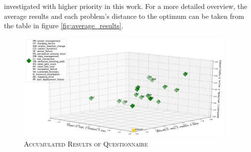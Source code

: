 \documentclass[english, master, utf8]{base/thesis_KBS}
\begin{document}
investigated with higher priority in this work. For a more detailed overview, the average results and each problem's distance to the optimum can be taken from the table 
in figure \ref{fig:average_results}.
\begin{figure}[H]
    \centering
    \includegraphics[width=0.95\textwidth]{pics/questionnaire.png}
    \caption{\textsc{Accumulated Results of Questionnaire}}
    \label{fig:questionnaire_results}
\end{figure}
\end{document}
